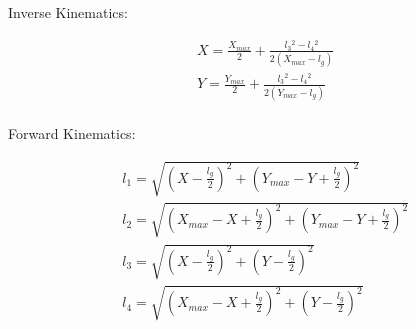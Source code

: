 \documentclass{article}
\begin{document}
Inverse Kinematics:

\begin{equation}
\begin{aligned}
&X = \frac{X_{max}}{2} + \frac{l_3{}^2 - l_4{}^2}{2\left(X_{max} - l_g\right)}\\
&Y = \frac{Y_{max}}{2} + \frac{l_3{}^2 - l_4{}^2}{2\left(Y_{max} - l_g\right)}\\
\end{aligned}
\end{equation}

Forward Kinematics:

\begin{equation}
\begin{aligned}
&l_1 = \sqrt{\left(X - \frac{l_g}{2}\right)^2 + \left(Y_{max}-Y+\frac{l_g}{2}\right)^2}\\
&l_2 = \sqrt{\left(X_{max}-X+\frac{l_g}{2}\right)^2 + \left(Y_{max}-Y+\frac{l_g}{2}\right)^2}\\
&l_3 = \sqrt{\left(X-\frac{l_g}{2}\right)^2 + \left(Y-\frac{l_g}{2}\right)^2}\\
&l_4 = \sqrt{\left(X_{max}-X+\frac{l_g}{2}\right)^2 + \left(Y-\frac{l_g}{2}\right)^2}\\
\end{aligned}
\end{equation}
\end{document}

